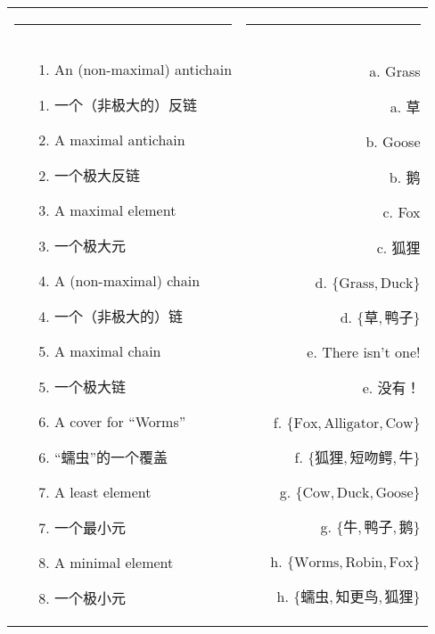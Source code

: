 \begin{enumerate}
    \begin{tabular}{lr}
    \rule{2.3in}{0pt} & \rule{2.3in}{0pt} \\
    \begin{minipage}[b]{.4\textwidth}
    \begin{enumerate}
    \item[1.] An (non-maximal) antichain
    \item[1.] 一个（非极大的）反链
    \item[2.] A maximal antichain
    \item[2.] 一个极大反链
    \item[3.] A maximal element
    \item[3.] 一个极大元
    \item[4.] A (non-maximal) chain
    \item[4.] 一个（非极大的）链
    \item[5.] A maximal chain
    \item[5.] 一个极大链
    \item[6.] A cover for ``Worms''
    \item[6.] “蠕虫”的一个覆盖
    \item[7.] A least element
    \item[7.] 一个最小元
    \item[8.] A minimal element
    \item[8.] 一个极小元
    \end{enumerate}
    \end{minipage} 
     & 
    \begin{minipage}[b]{.4\textwidth}
    \begin{enumerate}
    \item[a.] Grass 
    \item[a.] 草
    \item[b.] Goose
    \item[b.] 鹅
    \item[c.] Fox
    \item[c.] 狐狸
    \item[d.] $\{ \mbox{Grass}, \mbox{Duck} \}$
    \item[d.] $\{ \mbox{草}, \mbox{鸭子} \}$
    \item[e.] There isn't one!
    \item[e.] 没有！
    \item[f.] $\{ \mbox{Fox}, \mbox{Alligator}, \mbox{Cow} \}$
    \item[f.] $\{ \mbox{狐狸}, \mbox{短吻鳄}, \mbox{牛} \}$
    \item[g.] $\{ \mbox{Cow}, \mbox{Duck},  \mbox{Goose} \}$
    \item[g.] $\{ \mbox{牛}, \mbox{鸭子},  \mbox{鹅} \}$
    \item[h.] $\{ \mbox{Worms}, \mbox{Robin}, \mbox{Fox} \}$
    \item[h.] $\{ \mbox{蠕虫}, \mbox{知更鸟}, \mbox{狐狸} \}$
    \end{enumerate} 
    \end{minipage} \\
    \end{tabular}
    

\end{enumerate}
